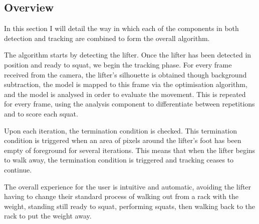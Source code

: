 \subsection{Overview}
\label{sec:algorithm_overview}

In this section I will detail the way in which each of the components in both detection and tracking are combined to form the overall algorithm.

The algorithm starts by detecting the lifter. Once the lifter has been detected in position and ready to squat, we begin the tracking phase. For every frame received from the camera, the lifter's silhouette is obtained though background subtraction, the model is mapped to this frame via the optimisation algorithm, and the model is analysed in order to evaluate the movement. This is repeated for every frame, using the analysis component to differentiate between repetitions and to score each squat.

Upon each iteration, the termination condition is checked. This termination condition is triggered when an area of pixels around the lifter's foot has been empty of foreground for several iterations. This means that when the lifter begins to walk away, the termination condition is triggered and tracking ceases to continue.

The overall experience for the user is intuitive and automatic, avoiding the lifter having to change their standard process of walking out from a rack with the weight, standing still ready to squat, performing squats, then walking back to the rack to put the weight away.